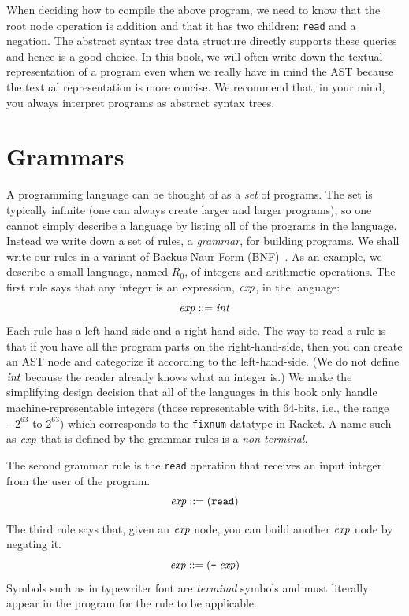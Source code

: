 \documentclass[11pt]{book}
\begin{document}
When deciding how to compile the above program, we need to know that
the root node operation is addition and that it has two children:
\texttt{read} and a negation. The abstract syntax tree data structure
directly supports these queries and hence is a good choice. In this
book, we will often write down the textual representation of a program
even when we really have in mind the AST because the textual
representation is more concise.  We recommend that, in your mind, you
always interpret programs as abstract syntax trees.

\section{Grammars}
\label{sec:grammar}

A programming language can be thought of as a \emph{set} of programs.
The set is typically infinite (one can always create larger and larger
programs), so one cannot simply describe a language by listing all of
the programs in the language. Instead we write down a set of rules, a
\emph{grammar}, for building programs. We shall write our rules in a
variant of Backus-Naur Form (BNF)~\citep{Backus:1960aa,Knuth:1964aa}.
As an example, we describe a small language, named $R_0$, of
integers and arithmetic operations. The first rule says that any
integer is an expression, $\mathit{exp}$, in the language:
\begin{equation}
\mathit{exp} ::= \mathit{int}  \label{eq:arith-int}
\end{equation}
Each rule has a left-hand-side and a right-hand-side. The way to read
a rule is that if you have all the program parts on the
right-hand-side, then you can create an AST node and categorize it
according to the left-hand-side. (We do not define $\mathit{int}$ because the
reader already knows what an integer is.) We make the simplifying
design decision that all of the languages in this book only handle
machine-representable integers (those representable with 64-bits,
i.e., the range $-2^{63}$ to $2^{63}$) which corresponds to the
\texttt{fixnum} datatype in Racket. A name such as $\mathit{exp}$ that is
defined by the grammar rules is a \emph{non-terminal}.

The second grammar rule is the \texttt{read} operation that receives
an input integer from the user of the program.
\begin{equation}
  \mathit{exp} ::= (\texttt{read}) \label{eq:arith-read}
\end{equation}

The third rule says that, given an $\mathit{exp}$ node, you can build another
$\mathit{exp}$ node by negating it.
\begin{equation}
  \mathit{exp} ::= (\texttt{-} \; \mathit{exp})  \label{eq:arith-neg}
\end{equation}
Symbols such as \key{-} in typewriter font are \emph{terminal} symbols
and must literally appear in the program for the rule to be
applicable.
\end{document}
